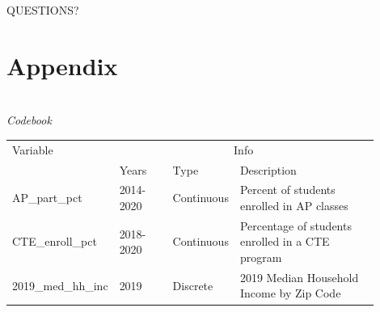 \documentclass[10pt]{beamer}
\begin{document}
{
\begin{frame}[standout]
  \LARGE QUESTIONS?
\end{frame}
}

\section{Appendix}

\begin{frame}
    \raggedleft
    \begin{threeparttable}
        \renewcommand\thetable{1}
        \caption{\\\textit{Codebook}}
        \begin{tabular}{ p{0.22\linewidth} p{0.15\linewidth} p{0.13\linewidth} p{0.4\linewidth}}
            \toprule
            Variable & \multicolumn{3}{c}{Info} \\
            \cmidrule(r){2-4}
            &   Years    &    Type                 &  Description \\ 
            \midrule
            AP\_part\_pct  & 2014-2020 &  Continuous   &   Percent of students enrolled in AP classes\\
            CTE\_enroll\_pct& 2018-2020  &  Continuous                  &  Percentage of students enrolled in a CTE program     \\
            2019\_med\_hh\_inc                     &  2019   &     Discrete         &   2019 Median Household Income by Zip Code           \\
            \midrule
        \end{tabular}
        \end{threeparttable}
\end{frame}
\end{document}
